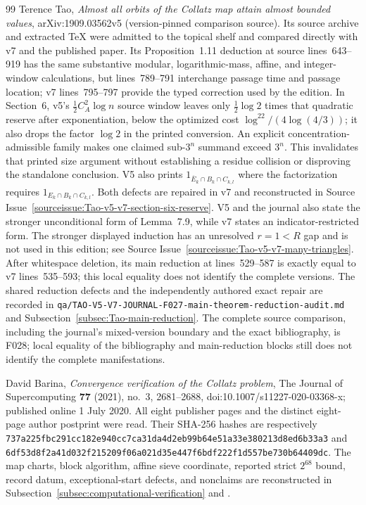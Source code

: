\begin{thebibliography}{99}
Terence Tao,
\emph{Almost all orbits of the Collatz map attain almost bounded values},
arXiv:1909.03562v5 (version-pinned comparison source).  Its source archive
and extracted TeX were admitted to the topical shelf and compared directly
with v7 and the published paper.  Its Proposition~1.11 deduction at source
lines~643--919 has the same substantive modular, logarithmic-mass, affine,
and integer-window calculations, but lines~789--791 interchange passage time
and passage location; v7 lines~795--797 provide the typed correction used by
the edition.  In Section~6, v5's \(\frac12C_A^2\log n\) source window leaves
only \(\frac12\log2\) times that quadratic reserve after exponentiation,
below the optimized cost
\(\log^22/(4\log(4/3))\); it also drops the factor \(\log2\) in the printed
conversion.  An explicit concentration-admissible family makes one claimed
sub-\(3^n\) summand exceed \(3^n\).  This invalidates that printed size
argument without establishing a residue collision or disproving the
standalone conclusion.  V5 also prints
\(1_{\overline E_k\cap B_k\cap C_{k,l}}\) where the factorization requires
\(1_{E_k\cap B_k\cap C_{k,l}}\).  Both defects are repaired in v7 and
reconstructed in
Source Issue~\ref{sourceissue:Tao-v5-v7-section-six-reserve}.  V5 and the
journal also state the stronger
unconditional form of Lemma~7.9, while v7 states an indicator-restricted
form.  The stronger displayed induction has an unresolved \(r=1<R\) gap and
is not used in this edition; see
Source Issue~\ref{sourceissue:Tao-v5-v7-many-triangles}.  After whitespace
deletion, its main reduction at lines~529--587 is exactly equal to v7
lines~535--593; this local equality does not identify the complete versions.
The shared reduction defects and the independently authored exact repair are
recorded in
\texttt{qa/TAO-V5-V7-JOURNAL-F027-main-theorem-reduction-audit.md} and
Subsection~\ref{subsec:Tao-main-reduction}.  The complete source comparison,
including the journal's mixed-version boundary and the exact bibliography,
is F028; local equality of the bibliography and main-reduction blocks still
does not identify the complete manifestations.

David Barina,
\emph{Convergence verification of the Collatz problem},
The Journal of Supercomputing \textbf{77} (2021), no.~3, 2681--2688,
doi:10.1007/s11227-020-03368-x; published online 1 July 2020.
All eight publisher pages and the distinct eight-page author postprint were
read.  Their SHA-256 hashes are respectively
\nolinkurl{737a225fbc291cc182e940cc7ca31da4d2eb99b64e51a33e380213d8ed6b33a3}
and
\nolinkurl{6df53d8f2a41d032f215209f06a021d35e447f6bdf222f1d557be730b64409dc}.
The map charts, block algorithm, affine sieve coordinate, reported strict
$2^{68}$ bound, record datum, exceptional-start defects, and nonclaims are
reconstructed in Subsection~\ref{subsec:computational-verification} and
.


\end{thebibliography}
